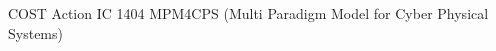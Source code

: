 \begin{acknowledgements}
COST Action IC 1404 MPM4CPS (Multi Paradigm Model for Cyber Physical Systems)
\end{acknowledgements}